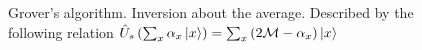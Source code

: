 \begin{figure}
\centering



\caption{Grover's algorithm. Inversion about the
  average. Described by the following relation
$\hat{U}_s\left(\sum_x \alpha_x \ket{x}\right) = 
\sum_x \left(2 \mathcal{M} - \alpha_x \right)\ket{x}$}
\label{figQuantCompGroverInvMiddle}
\end{figure}